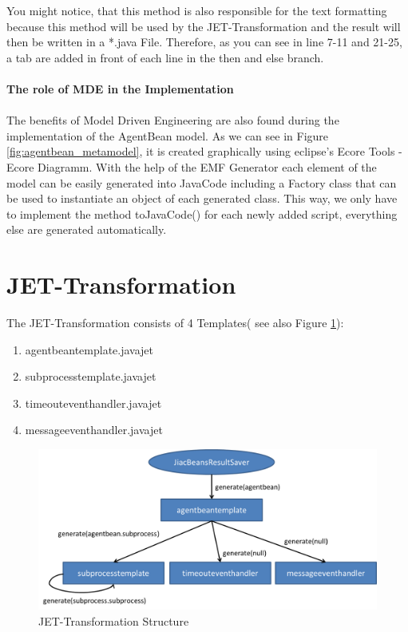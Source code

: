 You might notice, that this method is also responsible for the text formatting because this method will be used by the JET-Transformation and the result will then be written in a *.java File. Therefore, as you can see in line 7-11 and 21-25, a tab are added in front of each line in the then and else branch.\\\\
\textbf{The role of MDE in the Implementation}\\\\
The benefits of Model Driven Engineering are also found during the implementation of the AgentBean model. As we can see in Figure \ref{fig:agentbean_metamodel}, it is created graphically using eclipse's Ecore Tools - Ecore Diagramm. With the help of the EMF Generator each element of the model can be easily generated into JavaCode including a Factory class that can be used to instantiate an object of each generated class. This way, we only have to implement the method toJavaCode() for each newly added script, everything else are generated automatically. 


\newpage
\section{JET-Transformation}
The JET-Transformation consists of 4 Templates( see also Figure \ref{fig:transformation_structure}): 
\begin{enumerate}
	\item agentbeantemplate.javajet
	\item subprocesstemplate.javajet
	\item timeouteventhandler.javajet
	\item messageeventhandler.javajet
\end{enumerate}

\begin{figure}[h]
	\centering\includegraphics[width=1.0\textwidth]{images/templates_structure.png}
	\caption{JET-Transformation Structure}
	\label{fig:transformation_structure}
\end{figure}

